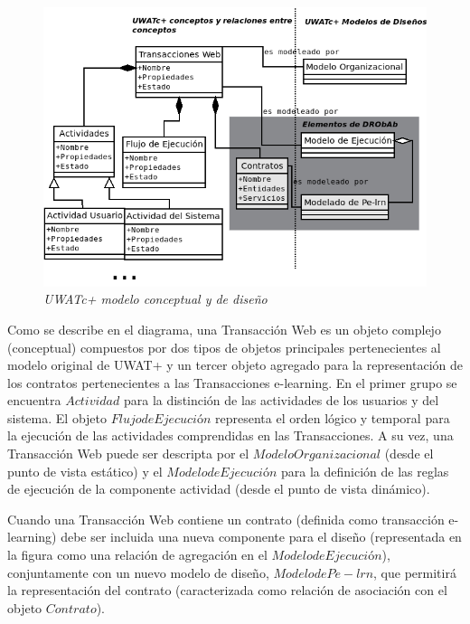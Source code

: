	\begin{figure}[!h]
        \begin{center}
        \includegraphics[width=5.3 in,totalheight=3.3 in]{Ch7/drobab11.png}
	\caption{\small \sl UWATc+ modelo conceptual y de diseño} \label{drobab7}
         \end{center}
         \end{figure}


Como se describe en el diagrama, una Transacción Web es un objeto complejo
(conceptual) compuestos por dos tipos de objetos principales pertenecientes al
modelo original de UWAT+ y un tercer objeto  agregado para la representación de
los contratos pertenecientes a las Transacciones e-learning. En el primer grupo
se encuentra $Actividad$ para la distinción de las actividades de los usuarios y
del sistema. El objeto $Flujo de Ejecución$ representa el orden lógico y
temporal para la ejecución de las actividades comprendidas en las Transacciones.
A su vez, una Transacción Web puede ser descripta por el $Modelo Organizacional$
(desde el punto de vista estático) y el $Modelo de Ejecución$ para la definición
de las reglas de ejecución de la componente actividad (desde el punto de vista
dinámico). 

Cuando una Transacción Web contiene un contrato (definida como transacción
e-learning) debe ser incluida una nueva componente para el diseño (representada
en la figura como una relación de agregación en el $Modelo de Ejecución$),
conjuntamente con un nuevo modelo de diseño, $Modelo de Pe-lrn$, que permitirá
la representación del contrato (caracterizada como relación de asociación con el
objeto $Contrato$).

